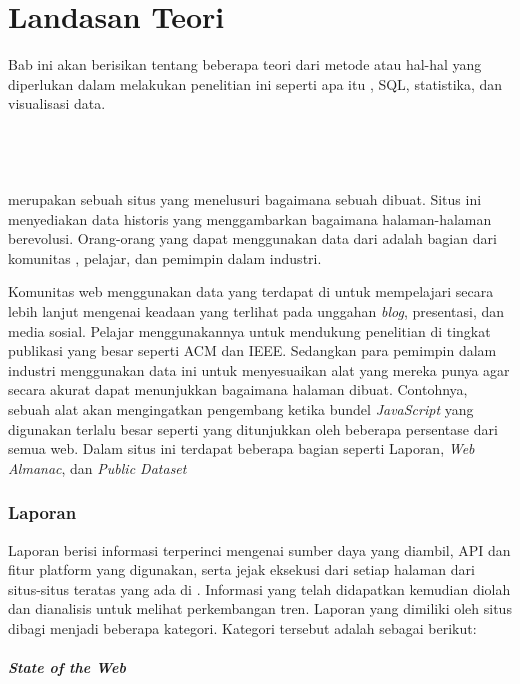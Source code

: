 \chapter{Landasan Teori}
\label{chap:teori}

Bab ini akan berisikan tentang beberapa teori dari metode atau hal-hal yang diperlukan dalam melakukan penelitian ini seperti apa itu \http, SQL, statistika, dan visualisasi data.

\section{\http~\cite{httpreports}}
\label{sec:httparchive} 

\http merupakan sebuah situs yang menelusuri bagaimana sebuah \web dibuat. Situs ini menyediakan data historis yang menggambarkan bagaimana halaman-halaman \web berevolusi. Orang-orang yang dapat menggunakan data dari \http adalah bagian dari komunitas \web, pelajar, dan pemimpin dalam industri. 

Komunitas web menggunakan data yang terdapat di \http untuk mempelajari secara lebih lanjut mengenai keadaan \web yang terlihat pada unggahan \textit{blog}, presentasi, dan media sosial. Pelajar menggunakannya untuk mendukung penelitian di tingkat publikasi yang besar seperti ACM dan IEEE. Sedangkan para pemimpin dalam industri menggunakan data ini untuk menyesuaikan alat yang mereka punya agar secara akurat dapat menunjukkan bagaimana halaman \web dibuat. Contohnya, sebuah alat akan mengingatkan pengembang ketika bundel \textit{JavaScript} yang digunakan terlalu besar seperti yang ditunjukkan oleh beberapa persentase dari semua web. Dalam situs \http ini terdapat beberapa bagian seperti Laporan, \textit{Web Almanac}, dan \textit{Public Dataset}

 
\subsection{Laporan}
\label{subsec:reports}

Laporan berisi informasi terperinci mengenai sumber daya yang diambil, API dan fitur platform yang digunakan, serta jejak eksekusi dari setiap halaman dari situs-situs teratas yang ada di \web. Informasi yang telah didapatkan kemudian diolah dan dianalisis untuk melihat perkembangan tren. Laporan yang dimiliki oleh situs \http dibagi menjadi beberapa kategori. Kategori tersebut adalah sebagai berikut:

\subsubsection{\textit{State of the Web}} 
\label{subsub:StateWeb}

